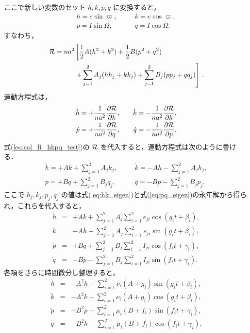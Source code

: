 \documentclass[11pt,a4paper,oneside,onecolumn]{jreport}
\begin{document}
ここで新しい変数のセット $h, k, p, q$ に変換すると，
\begin{eqnarray}
h = e \sin \varpi, & \quad & k = e \cos \varpi, \\
p = I \sin \Omega, & \quad & q = I \cos \Omega.
\end{eqnarray}
すなわち，
\begin{equation}
\begin{split}
{\cal R} = n a^2 & \left[ \frac{1}{2} A (h^2 + k^2) + \frac{1}{2} B (p^2 + q^2) \right. \\
& \left. + \sum_{j = 1}^2 A_j (h h_j + k k_j) + \sum_{j = 1}^2 B_j (p p_j + q q_j) \right]. \\
\end{split} \label{eq:cal_R_hkpq_test}
\end{equation} 
運動方程式は，
\begin{eqnarray}
\dot{h} = + \frac{1}{n a^2} \frac{\partial {\cal R}}{\partial k}, & \quad & \dot{k} = - \frac{1}{n a^2} \frac{\partial {\cal R}}{\partial h}, \\
\dot{p} = + \frac{1}{n a^2} \frac{\partial {\cal R}}{\partial q}, & \quad & \dot{q} = - \frac{1}{n a^2} \frac{\partial {\cal R}}{\partial p}.
\end{eqnarray}
式(\ref{eq:cal_R_hkpq_test})の ${\cal R}$ を代入すると，運動方程式は次のように書ける．
\begin{eqnarray}
\dot{h} = + A k + \sum_{j = 1}^2 A_j k_j, & \quad & \dot{k} = - A h - \sum_{j = 1}^2 A_j h_j, \\
\dot{p} = + B q + \sum_{j = 1}^2 B_j q_j, & \quad & \dot{q} = - B p - \sum_{j = 1}^2 B_j p_j.
\end{eqnarray}
ここで $h_j, k_j, p_j, q_j$ の値は式(\ref{eq:hk_eigen})と式(\ref{eq:pq_eigen})の永年解から得られ，これらを代入すると，
\begin{eqnarray}
\dot{h} & = & + A k + \sum_{j = 1}^2 A_j \sum_{i = 1}^2 e_{ji} \cos (g_i t + \beta_i), \\
\dot{k} & = & - A h - \sum_{j = 1}^2 A_j \sum_{i = 1}^2 e_{ji} \sin (g_i t + \beta_i), \\
\dot{p} & = & + B q + \sum_{j = 1}^2 B_j \sum_{i = 1}^2 I_{ji} \cos (f_i t + \gamma_i), \\
\dot{q} & = & - B p - \sum_{j = 1}^2 B_j \sum_{i = 1}^2 I_{ji} \sin (f_i t + \gamma_i).
\end{eqnarray}
各項をさらに時間微分し整理すると，
\begin{eqnarray}
\ddot{h} & = & - A^2 h - \sum_{i = 1}^2 \nu_i (A + g_i) \sin (g_i t + \beta_i), \\
\ddot{k} & = & - A^2 k - \sum_{i = 1}^2 \nu_i (A + g_i) \cos (g_i t + \beta_i), \\
\ddot{p} & = & - B^2 p - \sum_{i = 1}^2 \mu_i (B + f_i) \sin (f_i t + \gamma_i), \\
\ddot{q} & = & - B^2 h - \sum_{i = 1}^2 \mu_i (B + f_i) \cos (f_i t + \gamma_i).
\end{eqnarray}
\end{document}
